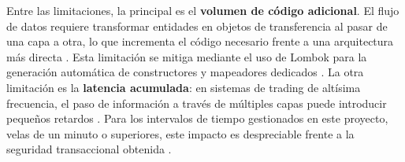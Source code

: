 Entre las limitaciones, la principal es el \textbf{volumen de código adicional}. El flujo de datos requiere transformar entidades en objetos de transferencia al pasar de una capa a otra, lo que incrementa el código necesario frente a una arquitectura más directa \parencite{richards_software_2022,martin_clean_architecture_2017}. Esta limitación se mitiga mediante el uso de Lombok para la generación automática de constructores y mapeadores dedicados \parencite{lombok_project_2024}. La otra limitación es la \textbf{latencia acumulada}: en sistemas de trading de altísima frecuencia, el paso de información a través de múltiples capas puede introducir pequeños retardos \parencite{treleaven_algorithmic_2013}. Para los intervalos de tiempo gestionados en este proyecto, velas de un minuto o superiores, este impacto es despreciable frente a la seguridad transaccional obtenida \parencite{oracle_mysql_acid_2024,pardo_evaluation_2008}.